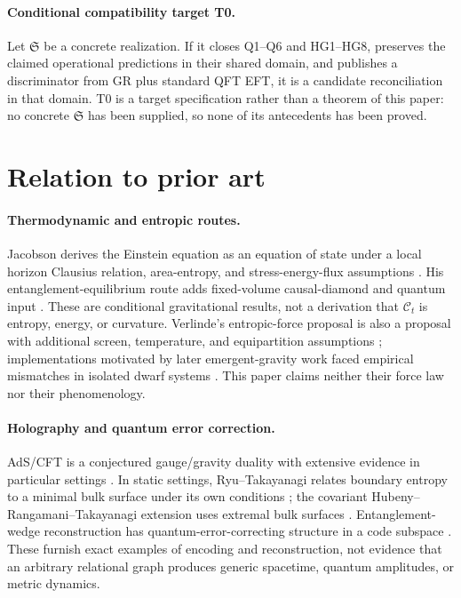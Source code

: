 \documentclass[11pt,a4paper]{article}
\theoremstyle{remark}
\newcommand{\Load}{\mathcal C}
\begin{document}
\paragraph{Conditional compatibility target T0.} Let $\mathfrak S$ be a
concrete realization. If it closes Q1--Q6 and HG1--HG8, preserves the claimed
operational predictions in their shared domain, and publishes a discriminator
from GR plus standard QFT EFT, it is a candidate reconciliation in that domain.
T0 is a target specification rather than a theorem of this paper: no concrete
$\mathfrak S$ has been supplied, so none of its antecedents has been proved.

\section{Relation to prior art}\label{sec:prior-art}
\paragraph{Thermodynamic and entropic routes.} Jacobson derives the Einstein
equation as an equation of state under a local horizon Clausius relation,
area-entropy, and stress-energy-flux assumptions \citep{jacobson1995}. His
entanglement-equilibrium route adds fixed-volume causal-diamond and quantum
input \citep{jacobson2016}. These are conditional gravitational results, not a
derivation that $\Load_t$ is entropy, energy, or curvature. Verlinde's
entropic-force proposal is also a proposal with additional screen, temperature,
and equipartition assumptions \citep{verlinde2011}; implementations motivated by
later emergent-gravity work faced empirical mismatches in isolated dwarf systems
\citep{lelli2017}. This paper claims neither their force law nor their
phenomenology.

\paragraph{Holography and quantum error correction.} AdS/CFT is a conjectured
gauge/gravity duality with extensive evidence in particular settings
\citep{maldacena1998}. In static settings, Ryu--Takayanagi relates boundary
entropy to a minimal bulk surface under its own conditions \citep{ryu2006}; the
covariant Hubeny--Rangamani--Takayanagi extension uses extremal bulk surfaces
\citep{hubeny2007}. Entanglement-wedge reconstruction has quantum-error-correcting
structure in a code subspace \citep{almheiri2015}. These furnish exact examples
of encoding and reconstruction, not evidence that an arbitrary relational graph
produces generic spacetime, quantum amplitudes, or metric dynamics.
\end{document}
